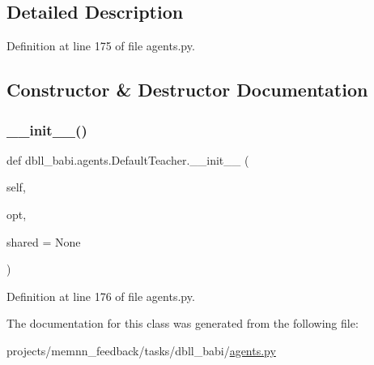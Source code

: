 \subsection{Detailed Description}


Definition at line 175 of file agents.\+py.



\subsection{Constructor \& Destructor Documentation}
\mbox{\label{classdbll__babi_1_1agents_1_1DefaultTeacher_a85fccd548f577a173a3497a5bd6d0e53}} 
\subsubsection{\texorpdfstring{\+\_\+\+\_\+init\+\_\+\+\_\+()}{\_\_init\_\_()}}
{\footnotesize\ttfamily def dbll\+\_\+babi.\+agents.\+Default\+Teacher.\+\_\+\+\_\+init\+\_\+\+\_\+ (\begin{DoxyParamCaption}\item[{}]{self,  }\item[{}]{opt,  }\item[{}]{shared = {\ttfamily None} }\end{DoxyParamCaption})}



Definition at line 176 of file agents.\+py.



The documentation for this class was generated from the following file\+:\begin{DoxyCompactItemize}
\item 
projects/memnn\+\_\+feedback/tasks/dbll\+\_\+babi/\hyperlink{projects_2memnn__feedback_2tasks_2dbll__babi_2agents_8py}{agents.\+py}\end{DoxyCompactItemize}

